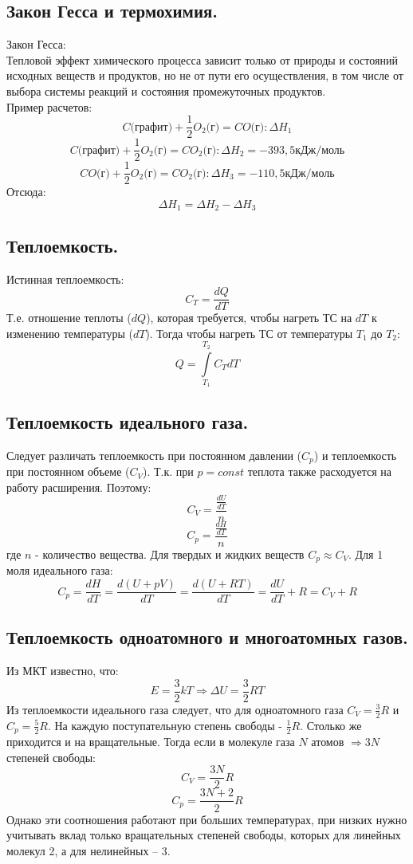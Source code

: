 \documentclass[14pt,a4paper]{scrartcl}
\begin{document}
		\subsection*{Закон Гесса и термохимия.} 
		Закон Гесса: \\
		Тепловой эффект химического процесса зависит только от природы и состояний исходных веществ и продуктов, но не от пути его осуществления, в том числе от выбора системы реакций и состояния промежуточных продуктов. \\
		Пример расчетов: \\
		$$C\text{(графит)} + \frac{1}{2}O_2\text{(г)} = CO\text{(г)}: \Delta{H_1}$$  
		$$C\text{(графит)} + \frac{1}{2}O_2\text{(г)} = CO_2\text{(г)}: \Delta{H_2} = -393,5 \text{кДж/моль}$$  			
		$$CO\text{(г)} + \frac{1}{2}O_2\text{(г)} = CO_2\text{(г)}: \Delta{H_3} = -110,5 \text{кДж/моль} $$  
		Отсюда:
		$$\Delta{H_1} = \Delta{H_2} - \Delta{H_3} $$
		\subsection*{Теплоемкость.} 		
		Истинная теплоемкость:
		$$C_T = \dfrac{dQ}{dT} $$
		Т.е. отношение теплоты ($dQ$), которая требуется, чтобы нагреть ТС на $dT$ к изменению температуры ($dT$). Тогда чтобы нагреть ТС от температуры $T_1$ до $T_2$:
		$$ Q = \int\limits_{T_1}^{T_2} C_T dT $$
		\subsection*{Теплоемкость идеального газа.} 
		Следует различать теплоемкость при постоянном давлении ($C_p$) и теплоемкость при постоянном объеме ($C_V$). Т.к. при $p=const$ теплота также расходуется на работу расширения. Поэтому:
		$$C_V = \dfrac{\frac{dU}{dT}}{n} $$
		$$C_p = \dfrac{\frac{dH}{dT}}{n} $$
		где $n$ - количество вещества. Для твердых и жидких веществ $C_p \approx C_V$. Для 1 моля идеального газа:
		$$C_p = \dfrac{dH}{dT} = \dfrac{d(U+pV)}{dT} = \dfrac{d(U+RT)}{dT} = \dfrac{dU}{dT} + R = C_V + R $$
		\subsection*{Теплоемкость одноатомного и многоатомных газов.} 
		Из МКТ известно, что:
		$$E = \dfrac{3}{2} kT \Rightarrow \Delta{U} = \dfrac{3}{2} RT $$
		Из теплоемкости идеального газа следует, что для одноатомного газа $C_V = \frac{3}{2} R $ и $C_p = \frac{5}{2}R$. На каждую поступательную степень свободы - $\frac{1}{2} R$. Столько же приходится и на вращательные. Тогда если в молекуле газа $N$ атомов $\Rightarrow 3N$ степеней свободы:
		$$ C_V = \dfrac{3N}{2} R $$
		$$ C_p = \dfrac{3N+2}{2} R $$
		Однако эти соотношения работают при больших температурах, при низких нужно учитывать вклад только вращательных степеней свободы, которых для линейных молекул 2, а для нелинейных -- 3.
\end{document}
